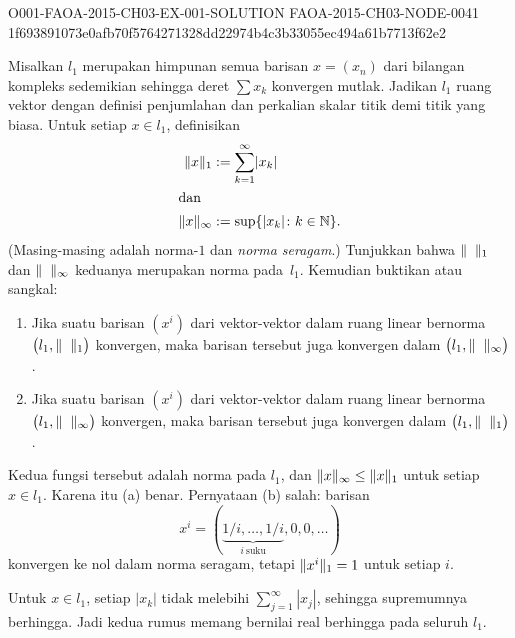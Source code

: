 \begin{o001solution}
  {O001-FAOA-2015-CH03-EX-001-SOLUTION}
  {FAOA-2015-CH03-NODE-0041}
  {1f693891073e0afb70f5764271328dd22974b4c3b33055ec494a61b7713f62e2}
\begin{o001statement}
\label{C023191} Misalkan
$l_1$ merupakan himpunan semua barisan $x = (x_n)$ dari bilangan kompleks sedemikian
sehingga deret $\sum x_k$ konvergen mutlak. Jadikan $l_1$ ruang vektor dengan definisi
penjumlahan dan perkalian skalar titik demi titik yang biasa. Untuk setiap $x \in l_1$,
definisikan
   \begin{align*}
      \lVert x\rVert_1 &:= \sum_{k=1}^\infty \lvert x_k\rvert \\
   \intertext{dan}
      \lVert x\rVert_\infty &:= \sup\{\lvert x_k\rvert\colon k \in \mathbb{N}\}.
   \end{align*}
(Masing-masing adalah
norma-$1$ dan
\emph{norma seragam}.) Tunjukkan bahwa $\lVert\hphantom{x}\rVert_1$ dan
$\lVert\hphantom{x}\rVert_\infty$ keduanya merupakan norma pada~$l_1$. Kemudian buktikan atau
sangkal:
 \begin{enumerate}
  \item[(a)] Jika suatu barisan $(x^i)$ dari vektor-vektor dalam ruang linear bernorma
$\bigl(l_1, \lVert\hphantom{x}\rVert_1\bigr)$ konvergen, maka barisan tersebut juga konvergen
dalam $\bigl(l_1, \lVert\hphantom{x}\rVert_\infty\bigr)$.
  \item[(b)] Jika suatu barisan $(x^i)$ dari vektor-vektor dalam ruang linear bernorma
$\bigl(l_1, \lVert\hphantom{x}\rVert_\infty\bigr)$ konvergen, maka barisan tersebut juga
konvergen dalam $\bigl(l_1, \lVert\hphantom{x}\rVert_1\bigr)$.
 \end{enumerate}
\end{o001statement}
\begin{o001answer}
Kedua fungsi tersebut adalah norma pada $l_1$, dan
$\lVert x\rVert_\infty\le\lVert x\rVert_1$ untuk setiap $x\in l_1$. Karena itu (a) benar.
Pernyataan (b) salah: barisan
\[
x^i=(\underbrace{1/i,\ldots,1/i}_{i\ \text{suku}},0,0,\ldots)
\]
konvergen ke nol dalam norma seragam, tetapi
$\lVert x^i\rVert_1=1$ untuk setiap $i$.
\end{o001answer}
\begin{o001proof}
Untuk $x\in l_1$, setiap $|x_k|$ tidak melebihi
$\sum_{j=1}^\infty|x_j|$, sehingga supremumnya berhingga. Jadi kedua rumus
memang bernilai real berhingga pada seluruh $l_1$.


\end{o001proof}
\end{o001solution}
